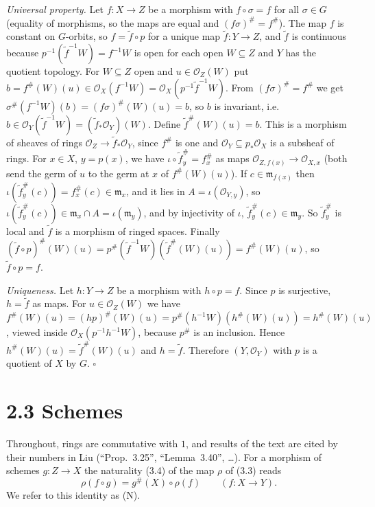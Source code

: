 \documentclass[11pt]{article}
\begin{document}
\emph{Universal property.} Let $f:X\to Z$ be a morphism with $f\circ\sigma=f$ for all $\sigma\in G$ (equality of morphisms, so the maps are equal and $(f\sigma)^\#=f^\#$). The map $f$ is constant on $G$-orbits, so $f=\tilde f\circ p$ for a unique map $\tilde f:Y\to Z$, and $\tilde f$ is continuous because $p^{-1}(\tilde f^{-1}W)=f^{-1}W$ is open for each open $W\subseteq Z$ and $Y$ has the quotient topology. For $W\subseteq Z$ open and $u\in\mathcal{O}_Z(W)$ put $b=f^\#(W)(u)\in\mathcal{O}_X(f^{-1}W)=\mathcal{O}_X(p^{-1}\tilde f^{-1}W)$. From $(f\sigma)^\#=f^\#$ we get $\sigma^\#(f^{-1}W)(b)=(f\sigma)^\#(W)(u)=b$, so $b$ is invariant, i.e.\ $b\in\mathcal{O}_Y(\tilde f^{-1}W)=(\tilde f_*\mathcal{O}_Y)(W)$. Define $\tilde f^\#(W)(u)=b$. This is a morphism of sheaves of rings $\mathcal{O}_Z\to\tilde f_*\mathcal{O}_Y$, since $f^\#$ is one and $\mathcal{O}_Y\subseteq p_*\mathcal{O}_X$ is a subsheaf of rings. For $x\in X$, $y=p(x)$, we have $\iota\circ\tilde f^\#_y=f^\#_x$ as maps $\mathcal{O}_{Z,f(x)}\to\mathcal{O}_{X,x}$ (both send the germ of $u$ to the germ at $x$ of $f^\#(W)(u)$). If $c\in\mathfrak{m}_{f(x)}$ then $\iota(\tilde f^\#_y(c))=f^\#_x(c)\in\mathfrak{m}_x$, and it lies in $A=\iota(\mathcal{O}_{Y,y})$, so $\iota(\tilde f_y^\#(c))\in\mathfrak{m}_x\cap A=\iota(\mathfrak{m}_y)$, and by injectivity of $\iota$, $\tilde f^\#_y(c)\in\mathfrak{m}_y$. So $\tilde f_y^\#$ is local and $\tilde f$ is a morphism of ringed spaces. Finally $(\tilde f\circ p)^\#(W)(u)=p^\#(\tilde f^{-1}W)(\tilde f^\#(W)(u))=f^\#(W)(u)$, so $\tilde f\circ p=f$.

\emph{Uniqueness.} Let $h:Y\to Z$ be a morphism with $h\circ p=f$. Since $p$ is surjective, $h=\tilde f$ as maps. For $u\in\mathcal{O}_Z(W)$ we have $f^\#(W)(u)=(hp)^\#(W)(u)=p^\#(h^{-1}W)(h^\#(W)(u))=h^\#(W)(u)$, viewed inside $\mathcal{O}_X(p^{-1}h^{-1}W)$, because $p^\#$ is an inclusion. Hence $h^\#(W)(u)=\tilde f^\#(W)(u)$ and $h=\tilde f$. Therefore $(Y,\mathcal{O}_Y)$ with $p$ is a quotient of $X$ by $G$. \hfill$\square$

\section*{2.3 Schemes}

Throughout, rings are commutative with $1$, and results of the text are cited by their numbers in Liu (``Prop.~3.25'', ``Lemma~3.40'', \dots). For a morphism of schemes $g:Z\to X$ the naturality (3.4) of the map $\rho$ of (3.3) reads
\[ \rho(f\circ g)=g^{\#}(X)\circ\rho(f)\qquad(f:X\to Y). \]
We refer to this identity as (N).
\end{document}
